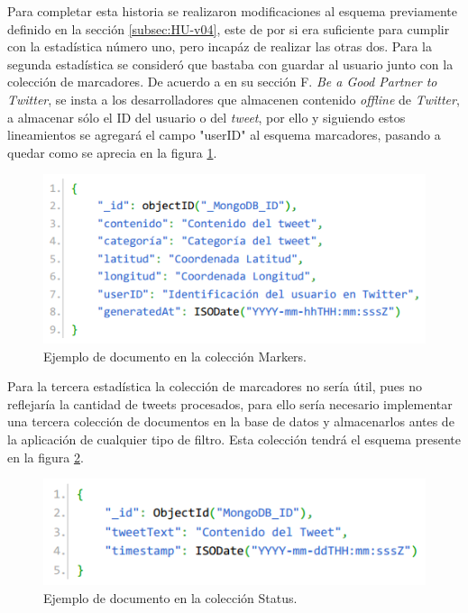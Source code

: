 Para completar esta historia se realizaron modificaciones al esquema previamente definido en la sección \ref{subsec:HU-v04}, este de por si era suficiente para cumplir con la estadística número uno, pero incapáz de realizar las otras dos. Para la segunda estadística se consideró que bastaba con guardar al usuario junto con la colección de marcadores. De acuerdo a \cite{TwitterAgreement} en su sección F. \textit{Be a Good Partner to Twitter}, se insta a los desarrolladores que almacenen contenido \textit{offline} de \textit{Twitter}, a almacenar sólo el ID del usuario o del \textit{tweet}, por ello y siguiendo estos lineamientos se agregará el campo "userID" al esquema marcadores, pasando a quedar como se aprecia en la figura \ref{fig:esquemaMarker2}.

\begin{figure}[H]
	\centering
	\captionsetup{justification=centering}
	\includegraphics[scale=0.8]{images/Marker2.png}
	\caption[Ejemplo de documento en la colección Markers.]{Ejemplo de documento en la colección Markers.}
	\label{fig:esquemaMarker2}
\end{figure}

Para la tercera estadística la colección de marcadores no sería útil, pues no reflejaría la cantidad de tweets procesados, para ello sería necesario implementar una tercera colección de documentos en la base de datos y almacenarlos antes de la aplicación de cualquier tipo de filtro. Esta colección tendrá el esquema presente en la figura \ref{fig:esquemaTweet}.

\begin{figure}[H]
	\centering
	\captionsetup{justification=centering}
	\includegraphics[scale=0.8]{images/status.png}
	\caption[Ejemplo de documento en la colección Status.]{Ejemplo de documento en la colección Status.}
	\label{fig:esquemaTweet}
\end{figure}

